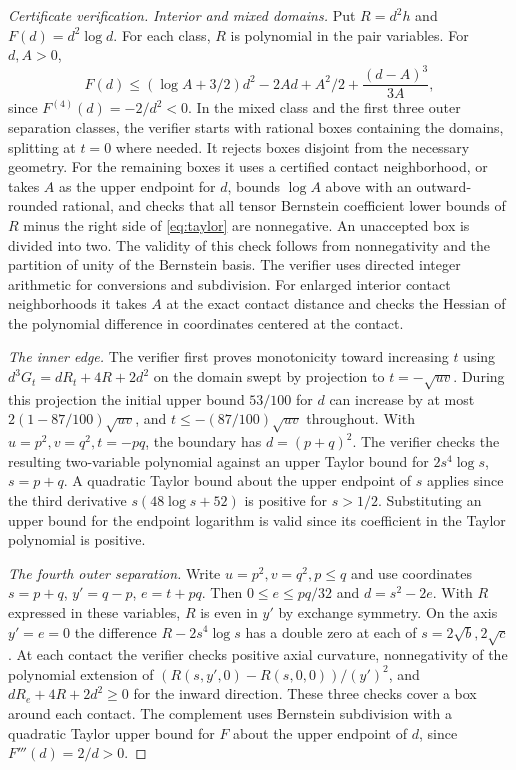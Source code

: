 \documentclass[11pt]{article}
\begin{document}
\begin{proof}[Certificate verification]
\emph{Interior and mixed domains.}
Put \(R=d^2h\) and \(F(d)=d^2\log d\). For each class, \(R\)
is polynomial in the pair variables. For \(d,A>0\),
\begin{equation}
 F(d)\le
  (\log A+3/2)d^2-2Ad+A^2/2+\frac{(d-A)^3}{3A},               \label{eq:taylor}
\end{equation}
since \(F^{(4)}(d)=-2/d^2<0\). In the mixed class and the first
three outer separation classes, the verifier starts with rational
boxes containing the domains, splitting at \(t=0\) where
needed. It rejects boxes disjoint from the necessary geometry.
For the remaining boxes it uses a certified contact neighborhood,
or takes \(A\) as the upper endpoint for \(d\), bounds
\(\log A\) above with an outward-rounded rational, and checks
that all tensor Bernstein coefficient lower bounds of \(R\)
minus the right side of \eqref{eq:taylor} are nonnegative.
An unaccepted box is divided into two. The validity of this
check follows from nonnegativity and the partition of unity
of the Bernstein basis. The verifier uses directed integer
arithmetic for conversions and subdivision. For enlarged
interior contact neighborhoods it takes \(A\) at the exact
contact distance and checks the Hessian of the polynomial
difference in coordinates centered at the contact.

\emph{The inner edge.}
The verifier first proves monotonicity toward increasing \(t\)
using \(d^3 G_t=dR_t+4R+2d^2\) on the domain swept by projection
to \(t=-\sqrt{uv}\). During this projection the initial
upper bound \(53/100\) for \(d\) can increase by at most
\(2(1-87/100)\sqrt{uv}\), and \(t\le-(87/100)\sqrt{uv}\)
throughout. With \(u=p^2,v=q^2,t=-pq\), the boundary has
\(d=(p+q)^2\). The verifier checks the resulting two-variable
polynomial against an upper Taylor bound for \(2s^4\log s\),
\(s=p+q\). A quadratic Taylor bound about the upper endpoint
of \(s\) applies since the third derivative
\(s(48\log s+52)\) is positive for \(s>1/2\). Substituting
an upper bound for the endpoint logarithm is valid since its
coefficient in the Taylor polynomial is positive.

\emph{The fourth outer separation.}
Write \(u=p^2,v=q^2,p\le q\) and use coordinates
\(s=p+q\), \(y'=q-p\), \(e=t+pq\).
Then \(0\le e\le pq/32\) and \(d=s^2-2e\).
With \(R\) expressed in these variables, \(R\) is even in \(y'\)
by exchange symmetry. On the axis \(y'=e=0\) the difference
\(R-2s^4\log s\) has a double zero at each of
\(s=2\sqrt b,2\sqrt c\). At each contact the verifier checks
positive axial curvature, nonnegativity of the polynomial
extension of \((R(s,y',0)-R(s,0,0))/(y')^2\), and
\(dR_e+4R+2d^2\ge0\) for the inward direction. These three
checks cover a box around each contact. The complement uses
Bernstein subdivision with a quadratic Taylor upper bound for
\(F\) about the upper endpoint of \(d\), since \(F'''(d)=2/d>0\).


\end{proof}
\end{document}
